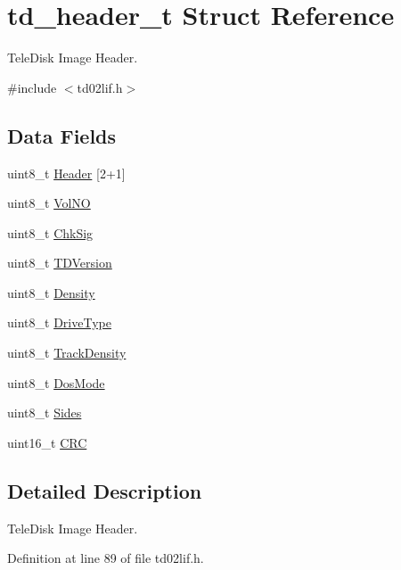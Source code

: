 \hypertarget{structtd__header__t}{}\section{td\+\_\+header\+\_\+t Struct Reference}
\label{structtd__header__t}


Tele\+Disk Image Header.  




{\ttfamily \#include $<$td02lif.\+h$>$}

\subsection*{Data Fields}
\begin{DoxyCompactItemize}
\item 
uint8\+\_\+t \hyperlink{structtd__header__t_a41510629d6bb7852f4e1e43443c38edd}{Header} \mbox{[}2+1\mbox{]}
\item 
uint8\+\_\+t \hyperlink{structtd__header__t_a081c4518281071d65fe82f6c8260b1f5}{Vol\+NO}
\item 
uint8\+\_\+t \hyperlink{structtd__header__t_ad226c52f8f8481b0ebf826dd3128ba3d}{Chk\+Sig}
\item 
uint8\+\_\+t \hyperlink{structtd__header__t_ac63e3625279d7262e3d094c0c5e5753a}{T\+D\+Version}
\item 
uint8\+\_\+t \hyperlink{structtd__header__t_a09c0c52ec99733db61dd6f3c7d052325}{Density}
\item 
uint8\+\_\+t \hyperlink{structtd__header__t_a865bd11809e67fd4ca8f1af0c46d9600}{Drive\+Type}
\item 
uint8\+\_\+t \hyperlink{structtd__header__t_a2d1461bb956665d519d33fca629477ab}{Track\+Density}
\item 
uint8\+\_\+t \hyperlink{structtd__header__t_acb0710bd6f98290ea2490ce678b63894}{Dos\+Mode}
\item 
uint8\+\_\+t \hyperlink{structtd__header__t_a8b188d880b5d9d94122674265b0ca3e6}{Sides}
\item 
uint16\+\_\+t \hyperlink{structtd__header__t_ae51197a200b65947359773f1aeea9c2d}{C\+RC}
\end{DoxyCompactItemize}


\subsection{Detailed Description}
Tele\+Disk Image Header. 

Definition at line 89 of file td02lif.\+h.



